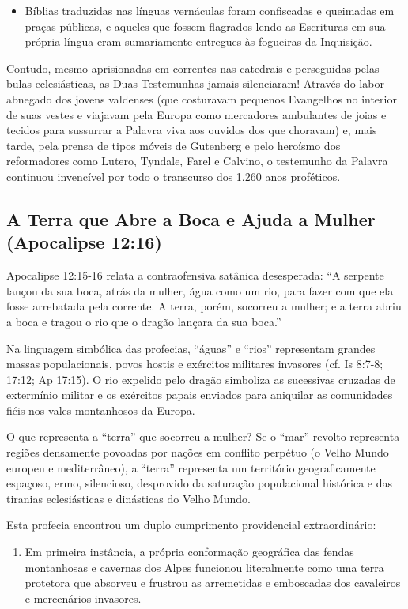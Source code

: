 \documentclass[11pt,a4paper,openany]{book}
\begin{document}
\begin{itemize}
  \item Bíblias traduzidas nas línguas vernáculas foram confiscadas e queimadas em praças públicas, e aqueles que fossem flagrados lendo as Escrituras em sua própria língua eram sumariamente entregues às fogueiras da Inquisição.
\end{itemize}


Contudo, mesmo aprisionadas em correntes nas catedrais e perseguidas pelas bulas eclesiásticas, as Duas Testemunhas jamais silenciaram! Através do labor abnegado dos jovens valdenses (que costuravam pequenos Evangelhos no interior de suas vestes e viajavam pela Europa como mercadores ambulantes de joias e tecidos para sussurrar a Palavra viva aos ouvidos dos que choravam) e, mais tarde, pela prensa de tipos móveis de Gutenberg e pelo heroísmo dos reformadores como Lutero, Tyndale, Farel e Calvino, o testemunho da Palavra continuou invencível por todo o transcurso dos 1.260 anos proféticos.



\subsection{A Terra que Abre a Boca e Ajuda a Mulher (Apocalipse 12:16)}


Apocalipse 12:15-16 relata a contraofensiva satânica desesperada: ``A serpente lançou da sua boca, atrás da mulher, água como um rio, para fazer com que ela fosse arrebatada pela corrente. A terra, porém, socorreu a mulher; e a terra abriu a boca e tragou o rio que o dragão lançara da sua boca.''

Na linguagem simbólica das profecias, ``águas'' e ``rios'' representam grandes massas populacionais, povos hostis e exércitos militares invasores (cf. Is 8:7-8; 17:12; Ap 17:15). O rio expelido pelo dragão simboliza as sucessivas cruzadas de extermínio militar e os exércitos papais enviados para aniquilar as comunidades fiéis nos vales montanhosos da Europa.

O que representa a ``terra'' que socorreu a mulher?
Se o ``mar'' revolto representa regiões densamente povoadas por nações em conflito perpétuo (o Velho Mundo europeu e mediterrâneo), a ``terra'' representa um território geograficamente espaçoso, ermo, silencioso, desprovido da saturação populacional histórica e das tiranias eclesiásticas e dinásticas do Velho Mundo.

Esta profecia encontrou um duplo cumprimento providencial extraordinário:
\begin{enumerate}
  \item Em primeira instância, a própria conformação geográfica das fendas montanhosas e cavernas dos Alpes funcionou literalmente como uma terra protetora que absorveu e frustrou as arremetidas e emboscadas dos cavaleiros e mercenários invasores.
\end{enumerate}
\end{document}
